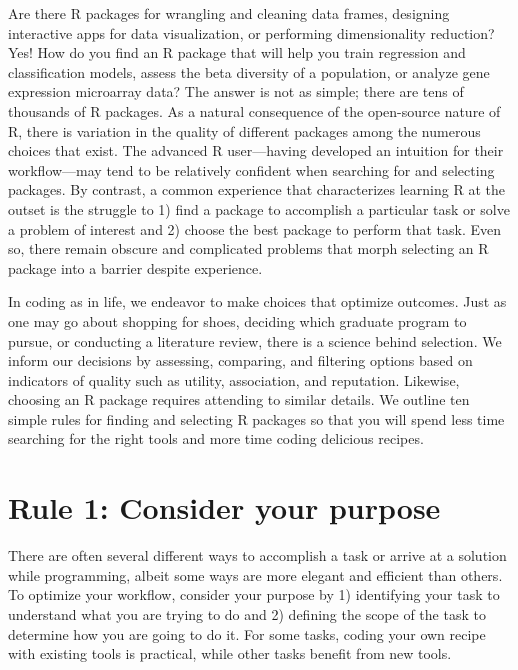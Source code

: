 \documentclass[10pt,letterpaper]{article}
\begin{document}
Are there R packages for wrangling and cleaning data frames, designing
interactive apps for data visualization, or performing dimensionality
reduction? Yes! How do you find an R package that will help you train
regression and classification models, assess the beta diversity of a
population, or analyze gene expression microarray data? The answer is
not as simple; there are tens of thousands of R packages. As a natural
consequence of the open-source nature of R, there is variation in the
quality of different packages among the numerous choices that exist. The
advanced R user---having developed an intuition for their workflow---may
tend to be relatively confident when searching for and selecting
packages. By contrast, a common experience that characterizes learning R
at the outset is the struggle to 1) find a package to accomplish a
particular task or solve a problem of interest and 2) choose the best
package to perform that task. Even so, there remain obscure and
complicated problems that morph selecting an R package into a barrier
despite experience.

In coding as in life, we endeavor to make choices that optimize
outcomes. Just as one may go about shopping for shoes, deciding which
graduate program to pursue, or conducting a literature review, there is
a science behind selection. We inform our decisions by assessing,
comparing, and filtering options based on indicators of quality such as
utility, association, and reputation. Likewise, choosing an R package
requires attending to similar details. We outline ten simple rules for
finding and selecting R packages so that you will spend less time
searching for the right tools and more time coding delicious recipes.

\hypertarget{rule-1-consider-your-purpose}{%
\section{Rule 1: Consider your
purpose}\label{rule-1-consider-your-purpose}}

There are often several different ways to accomplish a task or arrive at
a solution while programming, albeit some ways are more elegant and
efficient than others. To optimize your workflow, consider your purpose
by 1) identifying your task to understand what you are trying to do and
2) defining the scope of the task to determine how you are going to do
it. For some tasks, coding your own recipe with existing tools is
practical, while other tasks benefit from new tools.
\end{document}
